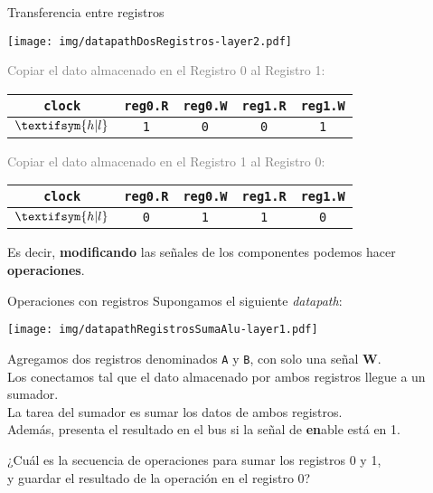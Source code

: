 \documentclass[aspectratio=169]{beamer}
\begin{document}
\begin{frame}[fragile,t]{Transferencia entre registros}
    \begin{center}
    \texttt{[image: img/datapathDosRegistros-layer2.pdf]}
    \end{center}
    \pause
    \textcolor{gray}{\small {Copiar el dato almacenado en el Registro 0 al Registro 1:}}\\
    \begin{center} \footnotesize
    \begin{tabular}{|c|c|c|c|c|} \hline
     \texttt{clock}             & \texttt{reg0.R} & \texttt{reg0.W} & \texttt{reg1.R} & \texttt{reg1.W} \\ \hline
     {\tiny $\textifsym{h|l}$}  & \texttt{1}      & \texttt{0}      & \texttt{0}      & \texttt{1}      \\ \hline
    \end{tabular}
    \end{center}
    \pause
    \textcolor{gray}{\small {Copiar el dato almacenado en el Registro 1 al Registro 0:}}\\
    \begin{center} \footnotesize
    \begin{tabular}{|c|c|c|c|c|} \hline
     \texttt{clock}             & \texttt{reg0.R} & \texttt{reg0.W} & \texttt{reg1.R} & \texttt{reg1.W} \\ \hline
     {\tiny $\textifsym{h|l}$}  & \texttt{0}      & \texttt{1}      & \texttt{1}      & \texttt{0}      \\ \hline
    \end{tabular}
    \end{center}
    \normalsize
    Es decir, \textbf{modificando} las señales de los componentes podemos hacer \textbf{operaciones}.
\end{frame}

\begin{frame}[fragile,t]{Operaciones con registros}
    \footnotesize Supongamos el siguiente \emph{datapath}:
    \vspace{-0.05cm}
    \begin{center}
    \texttt{[image: img/datapathRegistrosSumaAlu-layer1.pdf]}
    \end{center}
    \pause
    \vspace{-0.5cm}
    \small 
    Agregamos dos registros denominados \texttt{A} y \texttt{B}, con solo una señal \textbf{W}.\\
    Los conectamos tal que el dato almacenado por ambos registros llegue a un sumador.\\
    La tarea del sumador es sumar los datos de ambos registros.\\
    Además, presenta el resultado en el bus si la señal de \textbf{en}able está en 1.\\
    \pause
    \begin{center}
    \normalsize \textcolor{naranjauca}{¿Cuál es la secuencia de operaciones para sumar los registros 0 y 1,\\ y guardar el resultado de la operación en el registro 0?}
    \end{center}
\end{frame}
\end{document}
